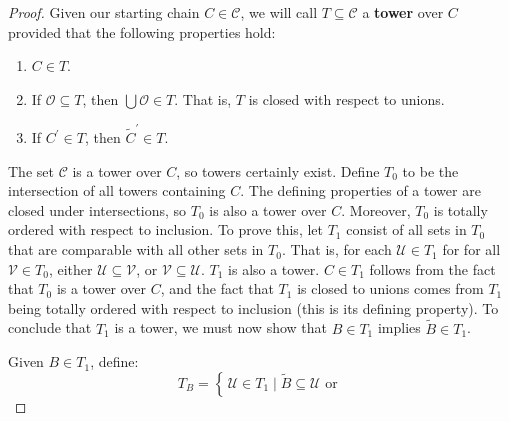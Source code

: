 \documentclass{article}
\theoremstyle{definition}
\newcommand*{\twiddle}[1]{%
    \tilde{#1}
}
\begin{document}
\begin{proof}
                \par\hfill\par
                Given our starting chain $C\in\mathcal{C}$, we will call
                $T\subseteq\mathcal{C}$ a \textbf{tower} over $C$ provided
                that the following properties hold:
                \begin{enumerate}
                    \item
                        $C\in{T}$.
                    \item
                        If $\mathcal{O}\subseteq{T}$, then
                        $\bigcup\mathcal{O}\in{T}$. That is, $T$ is closed
                        with respect to unions.
                    \item
                        If $C^{\prime}\in{T}$,
                        then $\twiddle{C}^{\prime}\in{T}$.
                \end{enumerate}
                The set $\mathcal{C}$ is a tower over $C$, so towers certainly
                exist. Define $T_{0}$ to be the intersection of all towers
                containing $C$. The defining properties of a tower are closed
                under intersections, so $T_{0}$ is also a tower over $C$.
                Moreover, $T_{0}$ is totally ordered with respect to inclusion.
                To prove this, let $T_{1}$ consist of all sets in $T_{0}$ that
                are comparable with all other sets in $T_{0}$. That is, for
                each $\mathcal{U}\in{T}_{1}$ for for all
                $\mathcal{V}\in{T}_{0}$, either
                $\mathcal{U}\subseteq\mathcal{V}$,
                or $\mathcal{V}\subseteq\mathcal{U}$. $T_{1}$ is also a tower.
                $C\in{T}_{1}$ follows from the fact that $T_{0}$ is a tower
                over $C$, and the fact that $T_{1}$ is closed to unions comes
                from $T_{1}$ being totally ordered with respect to inclusion
                (this is its defining property). To conclude that $T_{1}$ is a
                tower, we must now show that $B\in{T}_{1}$ implies
                $\twiddle{B}\in{T}_{1}$.
                \par\hfill\par
                Given $B\in{T}_{1}$, define:
                \begin{equation}
                    T_{B}=\left\{\,
                        \mathcal{U}\in{T}_{1}
                        \;\big|\;
                        \twiddle{B}\subseteq\mathcal{U}
                        \textrm{ or }

\end{equation}
\end{proof}
\end{document}
